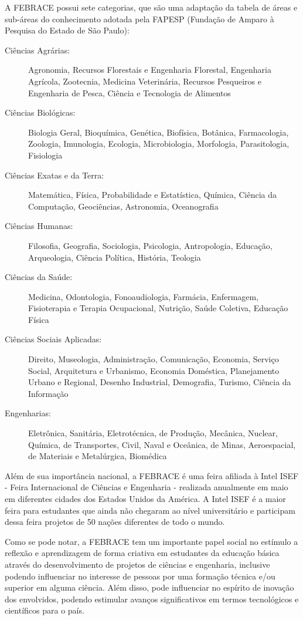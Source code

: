 A FEBRACE possui sete categorias, que são uma adaptação da tabela de áreas e sub-áreas do conhecimento adotada pela FAPESP (Fundação de Amparo à Pesquisa do Estado de São Paulo):

\begin{description}
    \item[Ciências Agrárias:] 
        Agronomia, Recursos Florestais e Engenharia Florestal, Engenharia Agrícola, Zootecnia, Medicina Veterinária, Recursos Pesqueiros e Engenharia de Pesca, Ciência e Tecnologia de Alimentos
    \item[Ciências Biológicas:] 
        Biologia Geral, Bioquímica, Genética, Biofísica, Botânica, Farmacologia, Zoologia, Imunologia, Ecologia, Microbiologia, Morfologia, Parasitologia, Fisiologia 	 
    \item[Ciências Exatas e da Terra:] 
        Matemática, Física, Probabilidade e Estatística, Química, Ciência da Computação, Geociências, Astronomia, Oceanografia 
    \item[Ciências Humanas:] 
        Filosofia, Geografia, Sociologia, Psicologia, Antropologia, Educação, Arqueologia, Ciência Política, História, Teologia 
    \item[Ciências da Saúde:] 
        Medicina, Odontologia, Fonoaudiologia, Farmácia, Enfermagem, Fisioterapia e Terapia Ocupacional, Nutrição, Saúde Coletiva, Educação Física
    \item[Ciências Sociais Aplicadas:] 
        Direito, Museologia, Administração, Comunicação, Economia, Serviço Social, Arquitetura e Urbanismo, Economia Doméstica, Planejamento Urbano e Regional, Desenho Industrial, Demografia, Turismo, Ciência da Informação  	 
    \item[Engenharias:] 
        Eletrônica, Sanitária, Eletrotécnica, de Produção, Mecânica, Nuclear, Química, de Transportes, Civil, Naval e Oceânica, de Minas, Aeroespacial, de Materiais e Metalúrgica, Biomédica 
\end{description}

Além de sua importância nacional, a FEBRACE é uma feira afiliada à Intel ISEF - Feira Internacional de Ciências e Engenharia - realizada anualmente em maio em diferentes cidades dos Estados Unidos da América. A Intel ISEF é a maior feira para estudantes que ainda não chegaram ao nível universitário e participam dessa feira projetos de 50 nações diferentes de todo o mundo.

Como se pode notar, a FEBRACE tem um importante papel social no estímulo a reflexão e aprendizagem de forma criativa em estudantes da educação básica através do desenvolvimento de projetos de ciências e engenharia, inclusive podendo influenciar no interesse de pessoas por uma formação técnica e/ou superior em alguma ciência. Além disso, pode influenciar no espírito de inovação dos envolvidos, podendo estimular avanços significativos em termos tecnológicos e científicos para o país.

